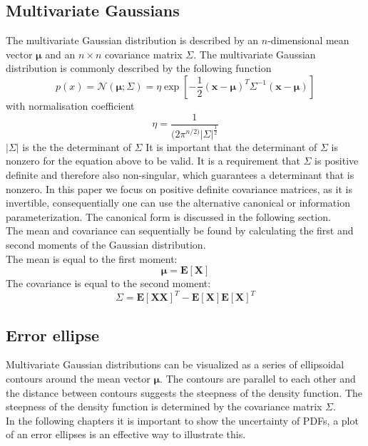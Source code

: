 \documentclass[12pt,oneside,openany,a4paper, %
afrikaans,english,
]{memoir}
\numberwithin{equation}{chapter}
\begin{document}
\subsection{Multivariate Gaussians}
The multivariate Gaussian distribution is described by an $n$-dimensional mean vector $\bm{\mu}$ and an $n\times n$ covariance matrix $\Sigma$. The multivariate Gaussian distribution is commonly described by the following function 
\begin{equation}\label{eq:3}
p(x) = \mathcal{N}(\bm{\mu};\Sigma) = \eta\exp\left[-\frac{1}{2}(\bm{x}-\bm{\mu})^T\Sigma^{-1}(\bm{x}-\bm{\mu})\right]
\end{equation}
with normalisation coefficient
\begin{equation}\label{eq:4}
\eta = \frac{1}{(2\pi^{n/2)}|\Sigma|^{\frac{1}{2}}}
\end{equation}
$|\Sigma|$ is the the determinant of $\Sigma$
It is important that the determinant of $\Sigma$ is nonzero for the equation above to be valid. It is a requirement that $\Sigma$ is positive definite and therefore also non-singular, which guarantees a  determinant that is nonzero. In this paper we focus on positive definite covariance matrices, as it is invertible, consequentially one can use the alternative canonical or information parameterization. The canonical form is discussed in the following section.\\
The mean and covariance can sequentially be found by calculating the first and second moments of the Gaussian distribution.\\
The mean is equal to the first moment:
\begin{equation}
\bm{\mu} = \bm{E}\left[\bm{X}\right]
\end{equation}
The covariance is equal to the second moment:
\begin{equation}
\Sigma = \bm{E}[\bm{XX}]^T - \bm{E}[\bm{X}]\bm{E}[\bm{X}]^T
\end{equation}
\subsection{Error ellipse}
Multivariate Gaussian distributions can be visualized as a series of ellipsoidal contours around the mean vector $\bm{\mu}$. The contours are parallel to each other and the distance between contours suggests the steepness of the density function. The steepness of the density function is determined by the covariance matrix $\Sigma$.\\
In the following chapters it is important to show the uncertainty of PDFs, a plot of an error ellipses is an effective way to illustrate this.
\end{document}
